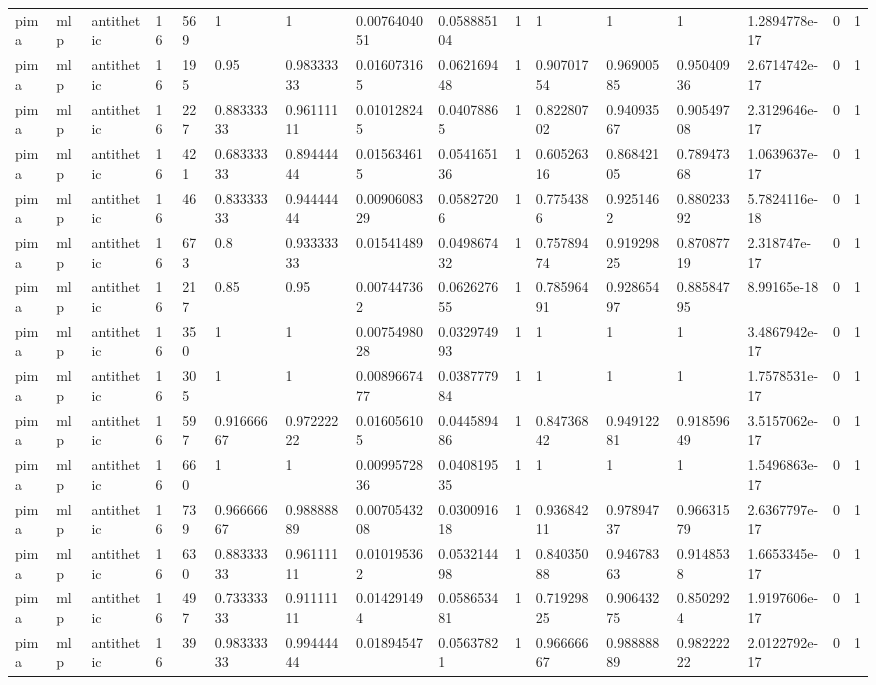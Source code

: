 \begin{tabular}{llllllllllllllll}
pima & mlp & antithetic & 16 & 569 & 1 & 1 & 0.0076404051 & 0.058885104 & 1 & 1 & 1 & 1 & 1.2894778e-17 & 0 & 1 \\
pima & mlp & antithetic & 16 & 195 & 0.95 & 0.98333333 & 0.016073165 & 0.062169448 & 1 & 0.90701754 & 0.96900585 & 0.95040936 & 2.6714742e-17 & 0 & 1 \\
pima & mlp & antithetic & 16 & 227 & 0.88333333 & 0.96111111 & 0.010128245 & 0.04078865 & 1 & 0.82280702 & 0.94093567 & 0.90549708 & 2.3129646e-17 & 0 & 1 \\
pima & mlp & antithetic & 16 & 421 & 0.68333333 & 0.89444444 & 0.015634615 & 0.054165136 & 1 & 0.60526316 & 0.86842105 & 0.78947368 & 1.0639637e-17 & 0 & 1 \\
pima & mlp & antithetic & 16 & 46 & 0.83333333 & 0.94444444 & 0.0090608329 & 0.05827206 & 1 & 0.7754386 & 0.9251462 & 0.88023392 & 5.7824116e-18 & 0 & 1 \\
pima & mlp & antithetic & 16 & 673 & 0.8 & 0.93333333 & 0.01541489 & 0.049867432 & 1 & 0.75789474 & 0.91929825 & 0.87087719 & 2.318747e-17 & 0 & 1 \\
pima & mlp & antithetic & 16 & 217 & 0.85 & 0.95 & 0.007447362 & 0.062627655 & 1 & 0.78596491 & 0.92865497 & 0.88584795 & 8.99165e-18 & 0 & 1 \\
pima & mlp & antithetic & 16 & 350 & 1 & 1 & 0.0075498028 & 0.032974993 & 1 & 1 & 1 & 1 & 3.4867942e-17 & 0 & 1 \\
pima & mlp & antithetic & 16 & 305 & 1 & 1 & 0.0089667477 & 0.038777984 & 1 & 1 & 1 & 1 & 1.7578531e-17 & 0 & 1 \\
pima & mlp & antithetic & 16 & 597 & 0.91666667 & 0.97222222 & 0.016056105 & 0.044589486 & 1 & 0.84736842 & 0.94912281 & 0.91859649 & 3.5157062e-17 & 0 & 1 \\
pima & mlp & antithetic & 16 & 660 & 1 & 1 & 0.0099572836 & 0.040819535 & 1 & 1 & 1 & 1 & 1.5496863e-17 & 0 & 1 \\
pima & mlp & antithetic & 16 & 739 & 0.96666667 & 0.98888889 & 0.0070543208 & 0.030091618 & 1 & 0.93684211 & 0.97894737 & 0.96631579 & 2.6367797e-17 & 0 & 1 \\
pima & mlp & antithetic & 16 & 630 & 0.88333333 & 0.96111111 & 0.010195362 & 0.053214498 & 1 & 0.84035088 & 0.94678363 & 0.9148538 & 1.6653345e-17 & 0 & 1 \\
pima & mlp & antithetic & 16 & 497 & 0.73333333 & 0.91111111 & 0.014291494 & 0.058653481 & 1 & 0.71929825 & 0.90643275 & 0.8502924 & 1.9197606e-17 & 0 & 1 \\
pima & mlp & antithetic & 16 & 39 & 0.98333333 & 0.99444444 & 0.01894547 & 0.05637821 & 1 & 0.96666667 & 0.98888889 & 0.98222222 & 2.0122792e-17 & 0 & 1 \\

\end{tabular}
